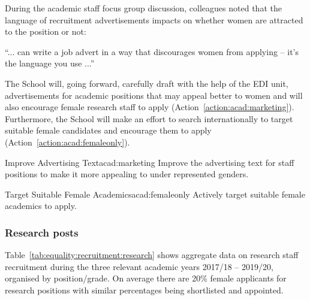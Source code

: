 During the academic staff focus group discussion, colleagues noted that the language of recruitment advertisements impacts on whether women are attracted to the position or not:

\begin{myquote}
``... can write a job advert in a way that discourages women from applying – it's the language you use ...''
\end{myquote}

The School will, going forward, carefully draft with the help of the EDI unit, advertisements for academic positions that may appeal better to women and will also encourage female research staff to apply (Action~\ref{action:acad:marketing}). Furthermore, the School will make an effort to search internationally to target suitable female candidates and encourage them to apply (Action~\ref{action:acad:femaleonly}).

\newcommand{\actacadmarketing}{%
Improve the advertising text for staff positions to make it more appealing to under represented genders.}
\begin{actionblock}{\ksspace{}Improve Advertising Text}{acad:marketing}
\actacadmarketing
\hfill{
    \hypersetup{hidelinks}
    \hyperlink{c2}{\gotoactionsymbol{}}
}
\end{actionblock}


\newcommand{\actacadfemaleonly}{%
Actively target suitable female academics to apply.}
\begin{actionblock}{\ksspace{}Target Suitable Female Academics}{acad:femaleonly}
\actacadfemaleonly
\hfill{
    \hypersetup{hidelinks}
    \hyperlink{c1}{\gotoactionsymbol{}}
}
\end{actionblock}

\subsubsection{Research posts}
Table~\ref{tab:equality:recruitment:research} shows aggregate data on research staff recruitment during the three relevant academic years 2017/18 – 2019/20, organised by position/grade.
On average there are 20\% female applicants for research positions with similar percentages being shortlisted and appointed. 

